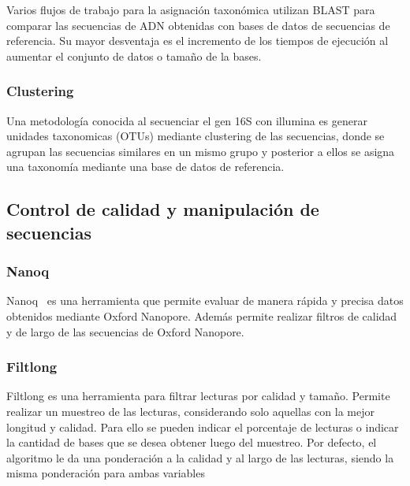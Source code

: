 Varios flujos de trabajo para la asignación taxonómica utilizan BLAST para comparar las secuencias de ADN obtenidas con bases de datos de secuencias de referencia.
Su mayor desventaja es el incremento de los tiempos de ejecución al aumentar el conjunto de datos o tamaño de la bases.


\subsubsection{Clustering }
Una metodología conocida al secuenciar el gen 16S con illumina es generar unidades taxonomicas (OTUs) mediante clustering de las secuencias, donde se agrupan las secuencias similares en un mismo grupo y posterior a ellos se asigna una taxonomía mediante una base de datos de referencia.


\subsection{Control de calidad y manipulación de secuencias}
\subsubsection{Nanoq}
Nanoq~\cite{steinig2022nanoq} es una herramienta que permite evaluar de manera rápida y precisa datos obtenidos mediante Oxford Nanopore. 
Además permite realizar filtros de calidad y de largo de las secuencias de Oxford Nanopore. 

\subsubsection{Filtlong}
Filtlong es una herramienta para filtrar lecturas por calidad y tamaño. 
Permite realizar un muestreo de las lecturas, considerando solo aquellas con la mejor longitud y calidad. 
Para ello se pueden indicar el porcentaje de lecturas o indicar la cantidad de bases que se desea obtener luego del muestreo.
Por defecto, el algoritmo le da una ponderación a la calidad y al largo de las lecturas, siendo la misma ponderación para ambas variables

